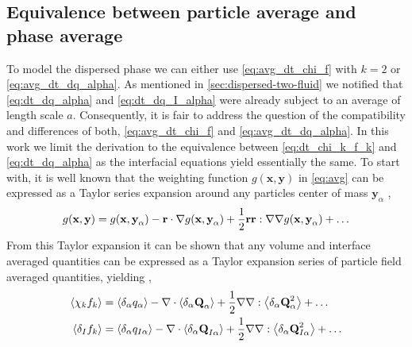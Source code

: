 
\subsection{Equivalence between particle average and phase average}

To model the dispersed phase we can either use \ref{eq:avg_dt_chi_f} with $k=2$ or \ref{eq:avg_dt_dq_alpha}. 
As mentioned in \ref{sec:dispersed-two-fluid} we notified that \ref{eq:dt_dq_alpha} and \ref{eq:dt_dq_I_alpha} were already subject to an average of length scale $a$. 
Consequently, it is fair to address the question of the compatibility and differences of both, \ref{eq:avg_dt_chi_f} and \ref{eq:avg_dt_dq_alpha}. 
In this work we limit the derivation to the equivalence between \ref{eq:dt_chi_k_f_k} and \ref{eq:dt_dq_alpha} as the interfacial equations yield essentially the same. 
To start with, it is well known that the weighting function $g(\textbf{x},\textbf{y})$ in \ref{eq:avg} can be expressed as a Taylor series expansion around any particles center of mass $\textbf{y}_\alpha$ \citep{nott2011suspension, jackson1997locally}, 
\begin{equation}
    g(\textbf{x},\textbf{y})
    = g(\textbf{x},\textbf{y}_\alpha)
    - \textbf{r} \cdot \mathbf{\nabla} g(\textbf{x},\textbf{y}_\alpha)
    + \frac{1}{2} \textbf{r}\textbf{r} : \mathbf{\nabla}\mathbf{\nabla} g(\textbf{x},\textbf{y}_\alpha)
    + \ldots
    \label{eq:g_exp}
\end{equation} 
From this Taylor expansion it can be shown that any volume and interface averaged quantities can be expressed as a Taylor expansion series of particle field averaged quantities, yielding \citep{nott2011suspension,jackson1997locally,buyevich1979flow},
\begin{align}
    \left<\chi_kf_k\right> 
    &=  \left<\delta_\alpha q_\alpha\right>
        - \mathbf{\nabla} \cdot  
        \left<\delta_\alpha \textbf{Q}_\alpha\right>        
        + \frac{1}{2} \mathbf{\nabla}\mathbf{\nabla} : \left<\delta_\alpha \textbf{Q}_\alpha^2\right>
        + \ldots  \\
    \left<\delta_I f_k\right> 
    &=  \left<\delta_\alpha q_{I\alpha}\right>        
        - \mathbf{\nabla} \cdot \left<\delta_\alpha \textbf{Q}_{I\alpha}\right>
        + \frac{1}{2} \mathbf{\nabla}\mathbf{\nabla} : \left<\delta_\alpha \textbf{Q}_{I\alpha}^{2}\right>
        + \ldots  
    \label{eq:f_exp}
\end{align}      
